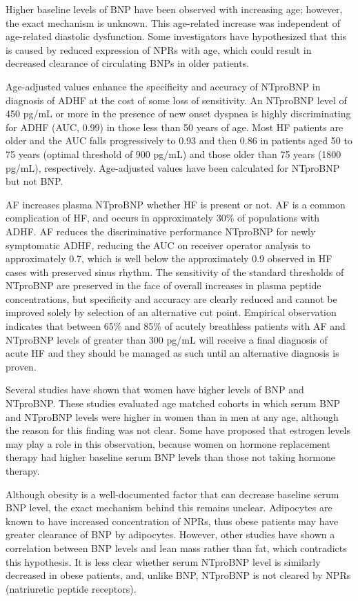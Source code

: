 \documentclass[14pt,a4paper,onecolumn]{extarticle}
\begin{document}
Higher baseline levels of BNP have been observed with increasing age; however, the exact mechanism is unknown. This age-related increase was independent of age-related diastolic dysfunction. Some investigators have hypothesized that this is caused by reduced expression of NPRs with age, which could result in decreased clearance of circulating BNPs in older patients. \citep{Maisel2018}

Age-adjusted values enhance the specificity and accuracy of NTproBNP in diagnosis of ADHF at the cost of some loss of sensitivity. An NTproBNP level of 450 pg/mL or more in the presence of new onset dyspnea is highly discriminating for ADHF (AUC, 0.99) in those less than 50 years of age. Most HF patients are older and the AUC falls progressively to 0.93 and then 0.86 in patients aged 50 to 75 years (optimal threshold of 900 pg/mL) and those older than 75 years (1800 pg/mL), respectively. Age-adjusted values have been calculated for NTproBNP but not BNP. \citep{Januzzi2006a}

AF increases plasma NTproBNP whether HF is present or not. AF is a common complication of HF, and occurs in approximately 30\% of populations with ADHF. AF reduces the discriminative performance NTproBNP for newly symptomatic ADHF, reducing the AUC on receiver operator analysis to approximately 0.7, which is well below the approximately 0.9 observed in HF cases with preserved sinus rhythm.  The sensitivity of the standard thresholds of NTproBNP are preserved in the face of overall increases in plasma peptide concentrations, but specificity and accuracy are clearly reduced and cannot be improved solely by selection of an alternative cut point. Empirical observation indicates that between 65\% and 85\% of acutely breathless patients with AF and NTproBNP levels of greater than 300 pg/mL will receive a final diagnosis of acute HF and they should be managed as such until an alternative diagnosis is proven.  \citep{Richards2013}

Several studies have shown that women have higher levels of BNP and NTproBNP. These studies evaluated age matched cohorts in which serum BNP and NTproBNP levels were higher in women than in men at any age, although the reason for this finding was not clear. Some have proposed that estrogen levels may play a role in this observation, because women on hormone replacement therapy had higher baseline serum BNP levels than those not taking hormone therapy. \citep{Maisel2018}

Although obesity is a well-documented factor that can decrease baseline serum BNP level, the exact mechanism behind this remains unclear.  Adipocytes are known to have increased concentration of NPRs, thus obese patients may have greater clearance of BNP by adipocytes. However, other studies have shown a correlation between BNP levels and lean mass rather than fat, which contradicts this hypothesis.  It is less clear whether serum NTproBNP level is similarly decreased in obese patients, and, unlike BNP, NTproBNP is not cleared by NPRs (natriuretic peptide receptors). \citep{Maisel2018}
\end{document}
